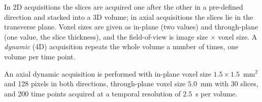 \documentclass[11pt]{exam}
\newcommand{\answerspace}[1]{\ifprintanswers\else\vspace{#1}\fi}
\begin{document}
\begin{questions}

\question
In 2D acquisitions the slices are acquired one after the other in a pre-defined direction and
stacked into a 3D volume; in axial acquisitions the slices lie in the transverse plane. Voxel
sizes are given as in-plane (two values) and through-plane (one value, the slice thickness), and
the field-of-view is image size $\times$ voxel size. A \emph{dynamic} (4D) acquisition repeats the
whole volume a number of times, one volume per time point.

\vspace{1mm}
\noindent An axial dynamic acquisition is performed with in-plane voxel size
$1.5 \times 1.5$~mm$^2$ and 128 pixels in both directions, through-plane voxel size $5.0$~mm with
30 slices, and 200 time points acquired at a temporal resolution of $2.5$~s per volume.

\end{questions}
\end{document}
